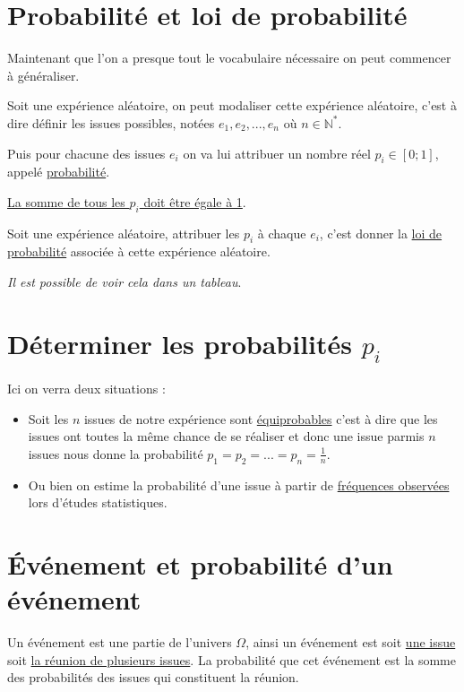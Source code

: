 \documentclass[french]{book}
\begin{document}
\section{Probabilité et loi de probabilité}
Maintenant que l'on a presque tout le vocabulaire nécessaire on peut commencer à généraliser.

\begin{defn}
Soit une expérience aléatoire, on peut modaliser cette expérience aléatoire, c'est à dire définir les issues possibles, notées $e_1,e_2,...,e_n$   où  $n \in \mathbb{N}^*$.

Puis pour chacune des issues $e_i$ on va lui attribuer un nombre réel $p_i \in [0;1]$, appelé \underline{probabilité}. 

\underline{La somme de tous les $p_i$ doit être égale à 1}.
\end{defn}

\begin{defn}
Soit une expérience aléatoire, attribuer les $p_i$ à chaque $e_i$, c'est donner la \underline{loi de probabilité} associée à cette expérience aléatoire.

\textit{Il est possible de voir cela dans un tableau}.
\end{defn}

\section{Déterminer les probabilités $p_i$}

Ici on verra deux situations : 
\begin{itemize}
\item Soit les $n$ issues de notre expérience sont  \underline{équiprobables} c'est à dire que les issues ont toutes la même chance de se réaliser et donc une issue parmis $n$ issues nous donne la probabilité $p_1=p_2=...=p_n=\frac{1}{n}$.
\item Ou bien on estime la probabilité d'une issue à partir de \underline{fréquences observées} lors d'études statistiques.
\end{itemize}

\section{Événement et probabilité d'un événement}

\begin{defn}
Un événement est une partie de l'univers $\Omega$, ainsi un événement est soit \underline{une issue} soit \underline{la réunion de plusieurs issues}. 
La probabilité que cet événement est la somme des probabilités des issues qui constituent la réunion.
\end{defn}
\end{document}
